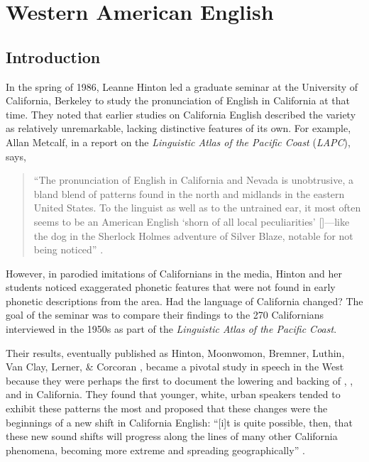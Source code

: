 \chapter{Western American English}
\label{ch:lit_review}




\section{Introduction}
\label{sec:lit_review_intro}

In the spring of 1986, Leanne Hinton led a graduate seminar at the University of California, Berkeley to study the pronunciation of English in California at that time. They noted that earlier studies on California English described the variety as relatively unremarkable, lacking distinctive features of its own. For example, Allan Metcalf, in a report on the \textit{Linguistic Atlas of the Pacific Coast} (\textit{LAPC}), says,
\begin{quote}
    ``The pronunciation of English in California and Nevada is unobtrusive, a bland blend of patterns found in the north and midlands in the eastern United States. To the linguist as well as to the untrained ear, it most often seems to be an American English `shorn of all local peculiarities' [\citep[192]{pei_1967}]---like the dog in the Sherlock Holmes adventure of Silver Blaze, notable for not being noticed'' \citep[8]{metcalf_nd}.
\end{quote}
However, in parodied imitations of Californians in the media, Hinton and her students noticed exaggerated phonetic features that were not found in early phonetic descriptions from the area. Had the language of California changed? The goal of the seminar was to compare their findings to the 270 Californians interviewed in the 1950s as part of the \textit{Linguistic Atlas of the Pacific Coast}.

Their results, eventually published as Hinton, Moonwomon, Bremner, Luthin, Van Clay, Lerner, \& Corcoran \citeyearpar{hinton_etal_1987}, became a pivotal study in speech in the West because they were perhaps the first to document the lowering and backing of \kit, \dress, and \trap in California. They found that younger, white, urban speakers tended to exhibit these patterns the most and proposed that these changes were the beginnings of a new shift in California English: ``[i]t is quite possible, then, that these new sound shifts will progress along the lines of many other California phenomena, becoming more extreme and spreading geographically'' \citep[126]{hinton_etal_1987}.


